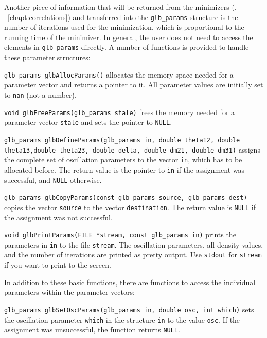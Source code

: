 Another piece of information that will be returned from the minimizers 
(\cf, \Chapt~\ref{chapt:correlations}) and transferred
into the {\tt glb\_params} structure is the number
of iterations used for the minimization, which is proportional to the
running time of the minimizer. In general, the user does not need to
access the elements in {\tt glb\_params} directly. A number of functions
is provided to handle these parameter structures:
\begin{function}
{\tt glb\_params glbAllocParams()} allocates the memory space
needed for a parameter vector and returns a pointer to it. All parameter values are
initially set to {\tt nan} (not a number).
\end{function}
\begin{function}
{\tt void glbFreeParams(glb\_params stale)} frees the memory
needed for a parameter vector {\tt stale} and sets the pointer to {\tt NULL}.
\end{function}
\begin{function}
{\tt glb\_params glbDefineParams(glb\_params in, double theta12, double theta13,double theta23, double delta, double dm21, double dm31)} assigns
the complete set of oscillation parameters to the vector {\tt in}, which has
to be allocated before. The return value is the pointer to {\tt in} if 
the assignment was successful, and {\tt NULL} otherwise.
\end{function}
\begin{function}
 {\tt glb\_params glbCopyParams(const glb\_params source, glb\_params dest)}
 copies the vector {\tt source} to the vector {\tt destination}. The return
 value is {\tt NULL} if the assignment was not successful.
\end{function}
\begin{function}
{\tt void glbPrintParams(FILE *stream, const glb\_params in)} prints the
parameters in {\tt in} to the file {\tt stream}. The oscillation
parameters, all density values, and the number of iterations are
printed as pretty output. Use {\tt stdout} for {\tt stream} if you want
to print to the screen.
\end{function}
In addition to these basic functions, there are functions to access
the individual parameters within the parameter vectors:
\begin{function}
{\tt glb\_params glbSetOscParams(glb\_params in, double osc, int which)}
sets the oscillation parameter {\tt which} in the structure {\tt in}
to the value {\tt osc}. If the assignment was unsuccessful, the 
function returns {\tt NULL}.
\end{function}
